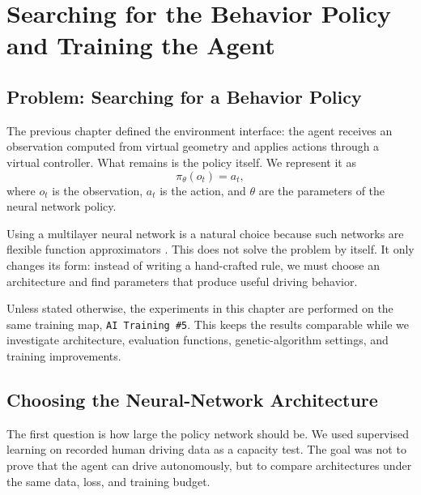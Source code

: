 \chapter[Searching for the Behavior Policy]{Searching for the Behavior Policy and Training the Agent}

\section{Problem: Searching for a Behavior Policy}

The previous chapter defined the environment interface: the agent receives an observation computed from virtual geometry and applies actions through a virtual controller. What remains is the policy itself. We represent it as
\[
    \pi_\theta(o_t)=a_t,
\]
where \(o_t\) is the observation, \(a_t\) is the action, and \(\theta\) are the parameters of the neural network policy.

Using a multilayer neural network is a natural choice because such networks are flexible function approximators \cite{goodfellow2016deep, cybenko1989approximation}. This does not solve the problem by itself. It only changes its form: instead of writing a hand-crafted rule, we must choose an architecture and find parameters that produce useful driving behavior.

Unless stated otherwise, the experiments in this chapter are performed on the same training map, \texttt{AI Training \#5}. This keeps the results comparable while we investigate architecture, evaluation functions, genetic-algorithm settings, and training improvements.

\section{Choosing the Neural-Network Architecture}

The first question is how large the policy network should be. We used supervised learning on recorded human driving data as a capacity test. The goal was not to prove that the agent can drive autonomously, but to compare architectures under the same data, loss, and training budget.

